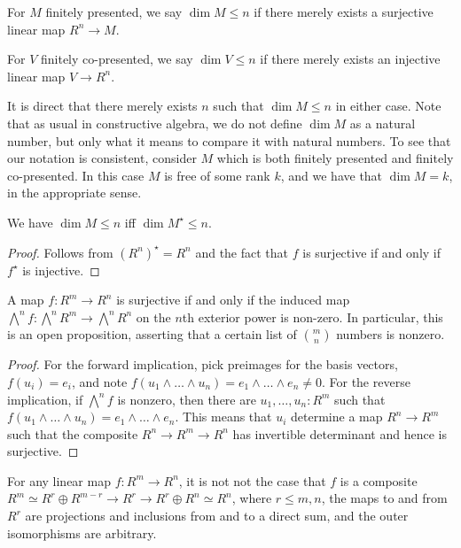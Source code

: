 \begin{definition}
For $M$ finitely presented, we say $\dim M \le n$ if
there merely exists a surjective linear map $R^n \to M$.

For $V$ finitely co-presented, we say $\dim V \le n$ if
there merely exists an injective linear map $V \to R^n$.
\end{definition}
It is direct  that there merely exists $n$ such that $\dim M \le n$ in
either case.
Note that as usual in constructive algebra, we do not define $\dim M$ as a natural
number, but only what it means to compare it with natural numbers.
To see that our notation is consistent, consider $M$ which is both
finitely presented and finitely co-presented.
In this case $M$ is free of some rank $k$, and we have that
$\dim M = k$, in the appropriate sense.
\begin{lemma}
We have $\dim M \le n$ iff $\dim M^\star \le n$.
\end{lemma}
\begin{proof}
Follows from $(R^n)^\star = R^n$ and the fact that $f$ is surjective if and only if
$f^\star$ is injective.
\end{proof}
\begin{lemma}\label{surjective-iff-nonzero-wedge}
A map $f : R^m \to R^n$ is surjective if and only if the induced map
$\bigwedge^n f : \bigwedge^n R^m \to \bigwedge^n R^n$ on the 
$n$th exterior power is non-zero.
In particular, this is an open proposition, asserting that a certain list of
$m \choose n$ numbers is nonzero.
\end{lemma}
\begin{proof}
For the forward implication, pick preimages for the basis vectors,
$f(u_i) = e_i$, 
and note $f(u_1 \wedge \ldots \wedge u_n) = e_1 \wedge \ldots \wedge e_n \ne 0$.
For the reverse implication, if $\bigwedge^n f$ is nonzero, then
there are $u_1,\ldots,u_n : R^m$ such that
$f(u_1\wedge\ldots\wedge u_n) = e_1 \wedge \ldots \wedge e_n$.
This means that $u_i$ determine a map $R^n \to R^m$ such that
the composite $R^n \to R^m \to R^n$ has invertible determinant and hence is surjective.
\end{proof}
\begin{lemma}\label{matrix-algorith}
For any linear map $f : R^m \to R^n$, it is not not the case that
$f$ is a composite $R^m \simeq R^r \oplus R^{m-r} \to R^r \to R^r \oplus R^n \simeq R^n$, 
where $r \le m,n$, the maps to and from $R^r$ are projections and inclusions
from and to a direct sum, and the outer isomorphisms are arbitrary.
\end{lemma}
